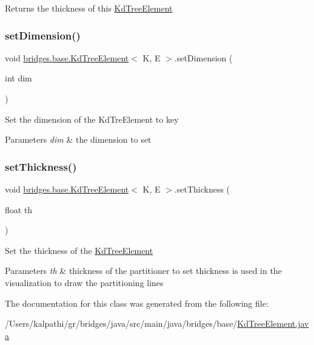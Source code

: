 \begin{DoxyReturn}{Returns}
the thickness of this \mbox{\hyperlink{classbridges_1_1base_1_1_kd_tree_element}{Kd\+Tree\+Element}} 
\end{DoxyReturn}
\mbox{\label{classbridges_1_1base_1_1_kd_tree_element_af3fa89cbd20fc2c3f30784db16b6dec4}} 
\subsubsection{\texorpdfstring{setDimension()}{setDimension()}}
{\footnotesize\ttfamily void \mbox{\hyperlink{classbridges_1_1base_1_1_kd_tree_element}{bridges.\+base.\+Kd\+Tree\+Element}}$<$ K, E $>$.set\+Dimension (\begin{DoxyParamCaption}\item[{int}]{dim }\end{DoxyParamCaption})}

Set the dimension of the Kd\+Tre\+Element to key 
\begin{DoxyParams}{Parameters}
{\em dim} & the dimension to set \\
\hline
\end{DoxyParams}
\mbox{\label{classbridges_1_1base_1_1_kd_tree_element_a52412fc59c743a8a0ede057ed2451be9}} 
\subsubsection{\texorpdfstring{setThickness()}{setThickness()}}
{\footnotesize\ttfamily void \mbox{\hyperlink{classbridges_1_1base_1_1_kd_tree_element}{bridges.\+base.\+Kd\+Tree\+Element}}$<$ K, E $>$.set\+Thickness (\begin{DoxyParamCaption}\item[{float}]{th }\end{DoxyParamCaption})}

Set the thickness of the \mbox{\hyperlink{classbridges_1_1base_1_1_kd_tree_element}{Kd\+Tree\+Element}} 
\begin{DoxyParams}{Parameters}
{\em th} & thickness of the partitioner to set thickness is used in the visualization to draw the partitioning lines \\
\hline
\end{DoxyParams}


The documentation for this class was generated from the following file\+:\begin{DoxyCompactItemize}
\item 
/\+Users/kalpathi/gr/bridges/java/src/main/java/bridges/base/\mbox{\hyperlink{_kd_tree_element_8java}{Kd\+Tree\+Element.\+java}}\end{DoxyCompactItemize}
